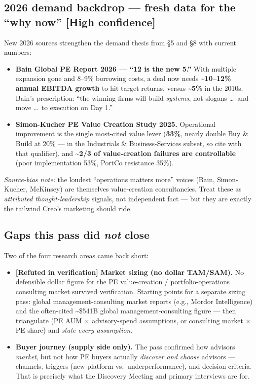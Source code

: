 \documentclass[11pt]{article}
\newcommand{\high}{\textcolor{green!45!black}{\textbf{[High confidence]}}}
\newcommand{\refuted}{\textcolor{red!75!black}{\textbf{[Refuted in verification]}}}
\begin{document}
\subsection{2026 demand backdrop --- fresh data for the ``why now'' \high}
New 2026 sources strengthen the demand thesis from \S5 and \S8 with current numbers:
\begin{itemize}
  \item \textbf{Bain Global PE Report 2026 --- ``12 is the new 5.''} With multiple
  expansion gone and 8--9\% borrowing costs, a deal now needs
  \textbf{\textasciitilde{}10--12\% annual EBITDA growth} to hit target returns, versus
  \textbf{\textasciitilde{}5\%} in the 2010s. Bain's prescription: ``the winning firms will
  build \emph{systems}, not slogans \ldots\ and move \ldots\ to execution on Day 1.''
  \item \textbf{Simon-Kucher PE Value Creation Study 2025.} Operational improvement is the
  single most-cited value lever (\textbf{33\%}, nearly double Buy \& Build at 20\% --- in
  the Industrials \& Business-Services subset, so cite with that qualifier), and
  \textbf{\textasciitilde{}2/3 of value-creation failures are controllable} (poor
  implementation 53\%, PortCo resistance 35\%).
\end{itemize}
\medskip
\noindent\emph{Source-bias note:} the loudest ``operations matters more'' voices (Bain,
Simon-Kucher, McKinsey) are themselves value-creation consultancies. Treat these as
\emph{attributed thought-leadership} signals, not independent fact --- but they are exactly
the tailwind Creo's marketing should ride.

\subsection{Gaps this pass did \emph{not} close}
Two of the four research areas came back short:
\begin{itemize}
  \item \refuted{} \textbf{Market sizing (no dollar TAM/SAM).} No defensible dollar figure
  for the PE value-creation / portfolio-operations consulting market survived verification.
  Starting points for a separate sizing pass: global management-consulting market reports
  (e.g., Mordor Intelligence) and the often-cited \textasciitilde{}\$541B global
  management-consulting figure --- then triangulate (PE AUM $\times$ advisory-spend
  assumptions, or consulting market $\times$ PE share) and \emph{state every assumption}.
  \item \textbf{Buyer journey (supply side only).} The pass confirmed how advisors
  \emph{market}, but not how PE buyers actually \emph{discover and choose} advisors ---
  channels, triggers (new platform vs.\ underperformance), and decision criteria. That is
  precisely what the Discovery Meeting and primary interviews are for.
\end{itemize}
\end{document}
